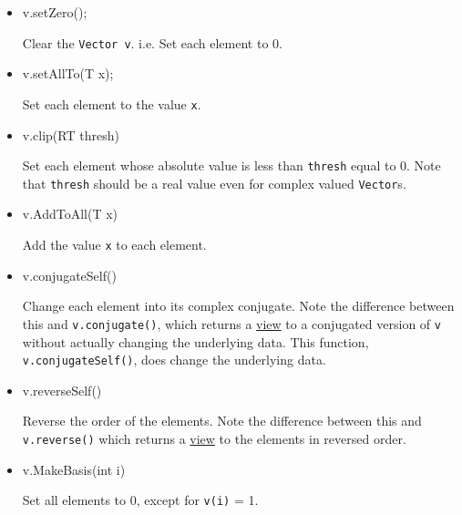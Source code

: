 \documentclass[twoside,letterpaper,11pt]{article}
\renewcommand{\tt}[1]{{\lstinline {#1}}}
\begin{document}
\begin{itemize}

\item
\begin{tmvcode}
v.setZero();
\end{tmvcode}
Clear the \tt{Vector v}.  i.e. Set each element to 0.

\item
\begin{tmvcode}
v.setAllTo(T x);
\end{tmvcode}
Set each element to the value \tt{x}.

\item
\begin{tmvcode}
v.clip(RT thresh)
\end{tmvcode}
Set each element whose absolute value is less than \tt{thresh} equal to 0.
Note that \tt{thresh} should be a real value even for complex valued
\tt{Vector}s.

\item
\begin{tmvcode}
v.AddToAll(T x)
\end{tmvcode}
Add the value \tt{x} to each element.

\item 
\begin{tmvcode}
v.conjugateSelf()
\end{tmvcode}
Change each element into its complex conjugate.  
Note the difference between this and \tt{v.conjugate()}, 
which returns a \underline{view} to a conjugated version of \tt{v} without
actually changing the underlying data.  This function, \tt{v.conjugateSelf()},
does change the underlying data.

\item
\begin{tmvcode}
v.reverseSelf()
\end{tmvcode}
Reverse the order of the elements.  Note the difference between this and 
\tt{v.reverse()} which returns a \underline{view} to the elements in 
reversed order.

\item
\begin{tmvcode}
v.MakeBasis(int i)
\end{tmvcode}
Set all elements to 0, except for \tt{v(i)} = 1.


\end{itemize}
\end{document}
